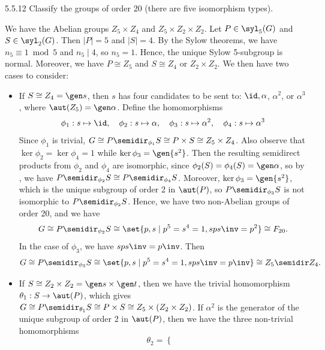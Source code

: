 \begin{exercise}{5.5.12}
    Classify the groups of order 20 (there are five isomorphism types).
\end{exercise}

\begin{sol}
    We have the Abelian groups $Z_5 \times Z_4$ and $Z_5 \times Z_2 \times Z_2$.
	Let $P \in \syl_5(G)$ and $S \in \syl_2(G)$.
	Then $|P| = 5$ and $|S| = 4$.
	By the Sylow theorems, we have $n_5 \equiv 1 \bmod 5$ and $n_5 \mid 4$, so $n_5 = 1$.
	Hence, the unique Sylow 5-subgroup is normal.
	Moreover, we have $P \cong Z_5$ and $S \cong Z_4$ or $Z_2 \times Z_2$.
	We then have two cases to consider:
    \begin{itemize}
        \item If $S \cong Z_4 = \gen s$, then $s$ has four candidates to be sent to: $\id, \alpha$, $\alpha^2$, or $\alpha^3$, where $\aut(Z_5) = \gen\alpha$.
	    Define the homomorphisms
        \[
        	\phi_1 : s \mapsto \id, \quad \phi_2 : s \mapsto \alpha, \quad \phi_3 : s \mapsto \alpha^2, \quad \phi_4 : s \mapsto \alpha^3
        \]
        Since $\phi_1$ is trivial, $G \cong P \semidir_{\phi_1} S \cong P \times S \cong Z_5 \times Z_4$.
        Also observe that $\ker\phi_2 = \ker\phi_4 = 1$ while $\ker\phi_3 = \gen{s^2}$.
        Then the resulting semidirect products from $\phi_2$ and $\phi_4$ are isomorphic, since $\phi_2(S) = \phi_4(S) = \gen\alpha$, so by , we have $P \semidir_{\phi_2} S \cong P \semidir_{\phi_4} S$.
        Moreover, $\ker\phi_3 = \gen{s^2}$, which is the unique subgroup of order 2 in $\aut(P)$, so $P \semidir_{\phi_3} S$ is not isomorphic to $P \semidir_{\phi_2} S$.
        Hence, we have two non-Abelian groups of order 20, and we have
        \[
        	G \cong P \semidir_{\phi_2} S \cong \set{p, s \mid p^5 = s^4 = 1, sps\inv = p^2} \cong F_{20}.
        \]
        In the case of $\phi_3$, we have $sps\inv = p\inv$.
	    Then
        \[
        	G \cong P \semidir_{\phi_3} S \cong \set{p, s \mid p^5 = s^4 = 1, sps\inv = p\inv} \cong Z_5 \semidir Z_4.
        \]
        \item If $S \cong Z_2 \times Z_2 = \gen s \times \gen t$, then we have the trivial homomorphism $\theta_1 : S \to \aut(P)$, which gives $G \cong P \semidir_{\theta_1} S \cong P \times S \cong Z_5 \times (Z_2 \times Z_2)$.
	    If $\alpha^2$ is the generator of the unique subgroup of order 2 in $\aut(P)$, then we have the three non-trivial homomorphisms
        \[
        	\theta_2 = 
            \begin{cases}

\end{cases}\]
\end{itemize}
\end{sol}
